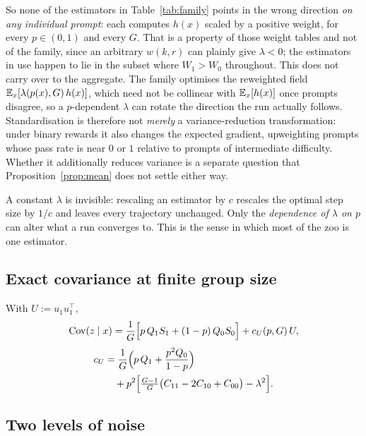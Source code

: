 So none of the estimators in Table~\ref{tab:family} points in the wrong direction \emph{on any
individual prompt}: each computes $h(x)$ scaled by a positive weight, for every $p \in (0,1)$ and
every $G$. That is a property of those weight tables and not of the family, since an arbitrary
$w(k,r)$ can plainly give $\lambda < 0$; the estimators in use happen to lie in the subset where
$W_1 > W_0$ throughout. This does not carry over to the aggregate. The family
optimises the reweighted field $\mathbb{E}_x[\lambda(p(x), G)\, h(x)]$, which need not be collinear with
$\mathbb{E}_x[h(x)]$ once prompts disagree, so a $p$-dependent $\lambda$ can rotate the direction the run
actually follows. Standardisation is therefore not \emph{merely} a variance-reduction transformation: under binary
rewards it also changes the expected gradient, upweighting prompts whose pass rate is near $0$ or
$1$ relative to prompts of intermediate difficulty. Whether it additionally reduces variance is a
separate question that Proposition~\ref{prop:mean} does not settle either way.

A constant $\lambda$ is invisible: rescaling an estimator by $c$ rescales the optimal step size by
$1/c$ and leaves every trajectory unchanged. Only the \emph{dependence of $\lambda$ on $p$} can
alter what a run converges to. This is the sense in which most of the zoo is one estimator.

\subsection{Exact covariance at finite group size}

\begin{proposition}
  \label{prop:cov}
  With $U := u_1 u_1^{\!\top}$,
  \begin{equation}
    \operatorname{Cov}(z \mid x)
    = \frac{1}{G}\Big[ p\,Q_1 S_1 + (1-p)\,Q_0 S_0 \Big]
    + c_U(p, G)\, U ,
  \end{equation}
    \begin{align}
    c_U &= \frac{1}{G}\Big( p\,Q_1 + \frac{p^2 Q_0}{1-p} \Big) \notag \\
    &\quad + p^2\Big[ \tfrac{G-1}{G}\big( C_{11} - 2C_{10} + C_{00} \big) - \lambda^2 \Big].
  \end{align}
\end{proposition}


\subsection{Two levels of noise}

